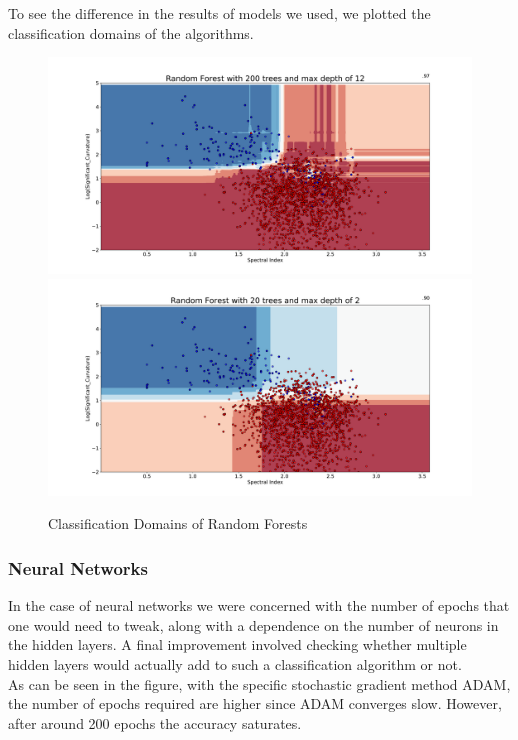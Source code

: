 To see the difference in the results of models we used, we plotted the classification domains of the algorithms. \\
\begin{figure}[h]
\includegraphics[width=\onepic\textwidth]{plots/classdom_rf_200,12.pdf}
\includegraphics[width=\onepic\textwidth]{plots/classdom_rf_20,2.pdf}
\caption{Classification Domains of Random Forests
}
\label{fig:Maps_data}
\end{figure}


\subsubsection{Neural Networks}

In the case of neural networks we were concerned with the number of epochs that one would need to tweak, along with a dependence on the number of neurons in the hidden layers. A final improvement involved checking whether multiple hidden layers would actually add to such a classification algorithm or not.\\
As can be seen in the figure, with the specific stochastic gradient method ADAM, the number of epochs required are higher since ADAM converges slow. However, after around 200 epochs the accuracy saturates. \\

